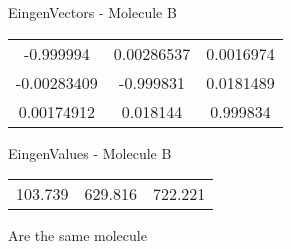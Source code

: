 \begin{multicols}{2}
\begin{center}
\vtab
 EingenVectors - Molecule B     \\
\vtab
\begin{tabular}{|c c c|}
-0.999994	 & 	0.00286537	 & 	0.0016974	 \\
-0.00283409	 & 	-0.999831	 & 	0.0181489	 \\
0.00174912	 & 	0.018144	 & 	0.999834
\end{tabular}

\vtab
 EingenValues - Molecule B     \\
\vtab
\begin{tabular}{|c c c|}
103.739	 & 	629.816	 & 	722.221
\end{tabular}

\end{center}
\end{multicols}
\begin{center}
\vtab
\vtab
\textcolor{NavyBlue}{\Large Are the same molecule}
\end{center}
\newpage

